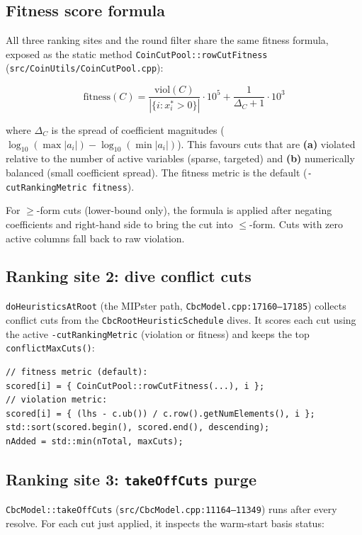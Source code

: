\documentclass[11pt,a4paper]{article}
\begin{document}
\subsection*{Fitness score formula}

All three ranking sites and the round filter share the same fitness
formula, exposed as the static method
\texttt{CoinCutPool::rowCutFitness}
(\texttt{src/CoinUtils/CoinCutPool.cpp}):

\[
  \text{fitness}(C) = \frac{\text{viol}(C)}{|\{i : x^\ast_i > 0\}|} \cdot 10^5
                    + \frac{1}{\Delta_C + 1} \cdot 10^3
\]

where $\Delta_C$ is the spread of coefficient magnitudes
($\log_{10}(\max|a_i|) - \log_{10}(\min|a_i|)$).  This favours cuts
that are \textbf{(a)} violated relative to the number of active
variables (sparse, targeted) and \textbf{(b)} numerically balanced
(small coefficient spread).  The fitness metric is the default
(\texttt{-cutRankingMetric fitness}).

For $\ge$-form cuts (lower-bound only), the formula is applied after
negating coefficients and right-hand side to bring the cut into
$\le$-form.  Cuts with zero active columns fall back to raw violation.

\subsection*{Ranking site 2: dive conflict cuts}

\texttt{doHeuristicsAtRoot} (the MIPster path,
\texttt{CbcModel.cpp:17160--17185}) collects conflict cuts from the
\texttt{CbcRootHeuristicSchedule} dives.  It scores each cut using
the active \texttt{-cutRankingMetric} (violation or fitness) and
keeps the top \texttt{conflictMaxCuts()}:

\begin{lstlisting}
// fitness metric (default):
scored[i] = { CoinCutPool::rowCutFitness(...), i };
// violation metric:
scored[i] = { (lhs - c.ub()) / c.row().getNumElements(), i };
std::sort(scored.begin(), scored.end(), descending);
nAdded = std::min(nTotal, maxCuts);
\end{lstlisting}

\subsection*{Ranking site 3: \texttt{takeOffCuts} purge}
\label{sec:takeoff}

\texttt{CbcModel::takeOffCuts}
(\texttt{src/CbcModel.cpp:11164--11349}) runs after every resolve.
For each cut just applied, it inspects the warm-start basis status:
\end{document}
